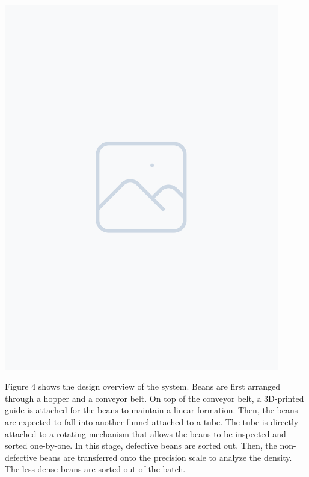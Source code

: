 \includegraphics[width=0.9\textwidth]{figure/placeholder.png} 

Figure 4 shows the design overview of the system. Beans are first arranged through a hopper and a conveyor belt. On top of the conveyor belt, a 3D-printed guide is attached for the beans to maintain a linear formation. Then, the beans are expected to fall into another funnel attached to a tube. The tube is directly attached to a rotating mechanism that allows the beans to be inspected and sorted one-by-one. In this stage, defective beans are sorted out. Then, the non-defective beans are transferred onto the precision scale to analyze the density. The less-dense beans are sorted out of the batch.

